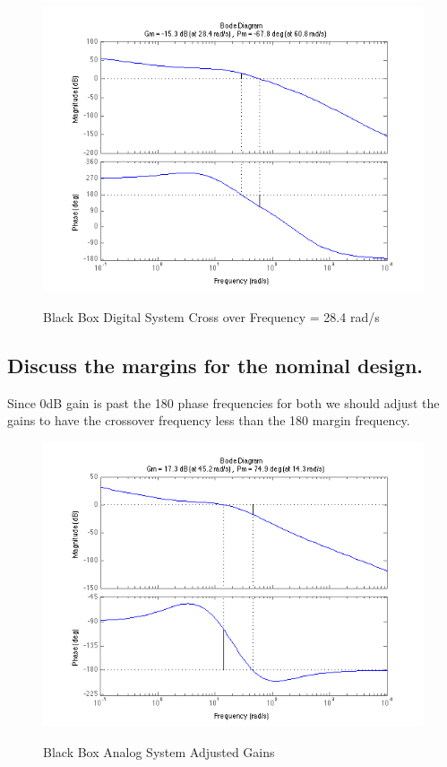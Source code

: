 \documentclass[english]{article}
\begin{document}
\begin{figure}[h!]
\caption{Black Box Digital System Cross over Frequency = 28.4 rad/s} 
\includegraphics[width = \linewidth]{4b_digital.png}
\label{fig:4_b2}
\end{figure}
\FloatBarrier

\subsection*{Discuss the margins for the nominal design.}
Since 0dB gain is past the 180 phase frequencies for both we should adjust the gains to have the crossover  frequency less than the 180 margin frequency. 
 
 \begin{figure}[h!]
\caption{Black Box Analog System Adjusted Gains} 
\includegraphics[width = \linewidth]{4c_analog.png}
\label{fig:4_c1}
\end{figure}
\end{document}
